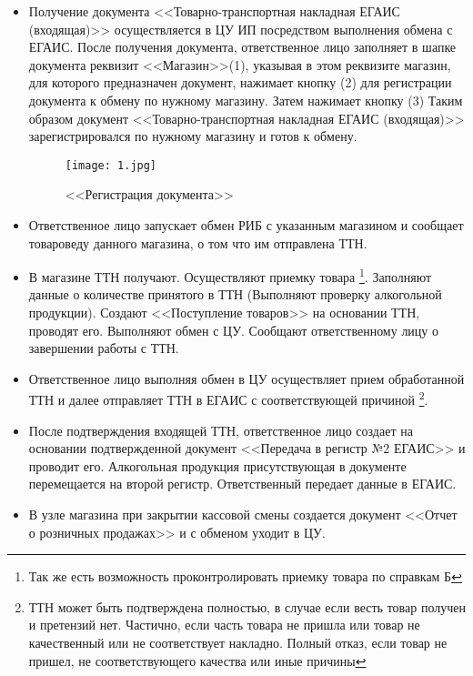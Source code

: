  \begin{itemize}
     \item Получение документа <<Товарно-транспортная накладная ЕГАИС (входящая)>> осуществляется в ЦУ ИП посредством выполнения обмена с ЕГАИС. После получения документа, ответственное лицо заполняет в шапке документа реквизит <<Магазин>>(1), указывая в этом реквизите магазин, для которого предназначен документ, нажимает кнопку (2) для регистрации документа к обмену по нужному магазину. Затем нажимает кнопку (3)
     Таким образом документ <<Товарно-транспортная накладная ЕГАИС (входящая)>> зарегистрировался по нужному магазину и готов к обмену.

     	\begin{figure}[H]
         \texttt{[image: 1.jpg]}
         \caption{<<Регистрация документа>>}
         \label{ris:1.jpg}
     \end{figure}


     \item  Ответственное лицо запускает обмен РИБ с указанным магазином и сообщает товароведу данного магазина, о том что им отправлена ТТН.
     \item В магазине ТТН получают. Осуществляют приемку товара \footnote{Так же есть возможность проконтролировать приемку товара по справкам Б}. Заполняют данные о количестве принятого в ТТН (Выполняют проверку алкогольной продукции). Создают <<Поступление товаров>> на основании ТТН, проводят его. Выполняют обмен с ЦУ. Сообщают ответственному лицу о завершении работы с ТТН.
     \item Ответственное лицо выполняя обмен в ЦУ осуществляет прием обработанной ТТН и далее отправляет ТТН в ЕГАИС с соответствующей причиной \footnote{ТТН может быть подтверждена полностью, в случае если весть товар получен и претензий нет. Частично, если часть товара не пришла или товар не качественный или не соответствует накладно. Полный отказ, если товар не пришел, не соответствующего качества или иные причины}.
     \item После подтверждения входящей ТТН, ответственное лицо создает на основании подтвержденной документ <<Передача в регистр №2 ЕГАИС>>  и проводит его. Алкогольная продукция присутствующая в документе перемещается на второй регистр. Ответственный передает данные в ЕГАИС.
     \item В узле магазина  при закрытии кассовой смены создается документ <<Отчет о розничных продажах>>  и с обменом уходит в ЦУ.


\end{itemize}
